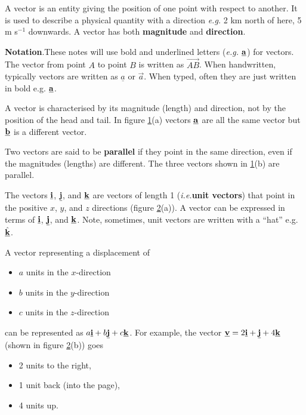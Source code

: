 A vector is an entity giving the position of one point with respect to another. It is used to describe a physical quantity with a direction \emph{e.g.} 2 km north of here, 5 m s$^{-1}$ downwards. A vector has both \textbf{magnitude} and \textbf{direction}.

\textbf{Notation}.These notes will use bold and underlined letters (\emph{e.g.} $\underline{\mathbf{a}}$) for vectors. The vector from point $A$ to point $B$ is written as $\overrightarrow{AB}$. When handwritten, typically vectors are written as $\underline{a}$ or $\overrightarrow{a}$. When typed, often they are just written in bold e.g. $\underline{\mathbf{a}}$.

A vector is characterised by its magnitude (length) and direction, not by the position of the head and tail. In figure \ref{fig:vec_sketch}(a) vectors $\underline{\mathbf{a}}$ are all the same vector but $\underline{\mathbf{b}}$ is a different vector.

Two vectors are said to be \textbf{parallel} if they point in the same direction, even if the magnitudes (lengths) are different. The three vectors shown in \ref{fig:vec_sketch}(b) are parallel.
\begin{figure}[ht]
    \centering
    \caption{}
    \label{fig:vec_sketch}
\end{figure}

The vectors $\underline{\mathbf{i}}$, $\underline{\mathbf{j}}$, and $\underline{\mathbf{k}}$ are vectors of length 1 (\emph{i.e.}\textbf{unit vectors}) that point in the positive $x$, $y$, and $z$ directions (figure \ref{fig:ijk}(a)). A vector can be expressed in terms of $\underline{\mathbf{i}}$, $\underline{\mathbf{j}}$, and $\underline{\mathbf{k}}$. Note, sometimes, unit vectors are written with a ``hat'' e.g. $\hat{\underline{\mathbf{k}}}$.

A vector representing a displacement of
\begin{itemize}
\item $a$ units in the $x$-direction
\item $b$ units in the $y$-direction
\item $c$ units in the $z$-direction
\end{itemize}
can be represented as $a\underline{\mathbf{i}}+b\underline{\mathbf{j}}+c\underline{\mathbf{k}}$. For example, the vector $\underline{\mathbf{v}}=2\underline{\mathbf{i}}+\underline{\mathbf{j}}+4\underline{\mathbf{k}}$ (shown in figure \ref{fig:ijk}(b)) goes
\begin{itemize}
\item 2 units to the right,
\item 1 unit back (into the page),
\item 4 units up.
\end{itemize}
\begin{figure}[ht]
    \centering
    \caption{}
    \label{fig:ijk}
\end{figure}


